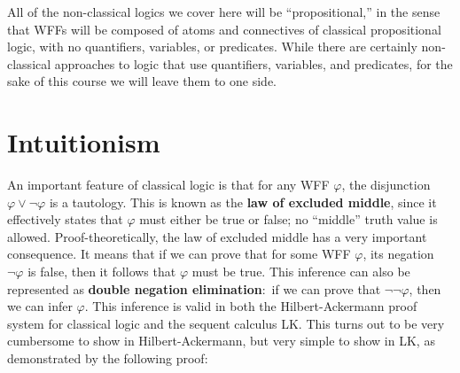 \documentclass[11pt]{article}
\theoremstyle{definition}
\theoremstyle{remark}
\begin{document}
All of the non-classical logics we cover here will be ``propositional,'' in the sense that WFFs will be composed of atoms and connectives of classical propositional logic, with no quantifiers, variables, or predicates. While there are certainly non-classical approaches to logic that use quantifiers, variables, and predicates, for the sake of this course we will leave them to one side.\par 

\section{Intuitionism}
An important feature of classical logic is that for any WFF $\varphi$, the disjunction $\varphi\vee\neg\varphi$ is a tautology. This is known as the \textbf{law of excluded middle}, since it effectively states that $\varphi$ must either be true or false; no ``middle'' truth value is allowed. Proof-theoretically, the law of excluded middle has a very important consequence. It means that if we can prove that for some WFF $\varphi$, its negation $\neg\varphi$ is false, then it follows that $\varphi$ must be true. This inference can also be represented as \textbf{double negation elimination}:\ if we can prove that $\neg\neg\varphi$, then we can infer $\varphi$. This inference is valid in both the Hilbert-Ackermann proof system for classical logic and the sequent calculus LK. This turns out to be very cumbersome to show in Hilbert-Ackermann, but very simple to show in LK, as demonstrated by the following proof:
\end{document}
